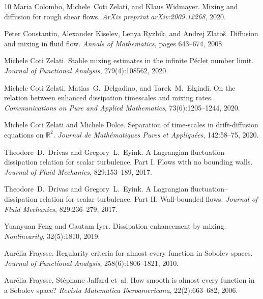 \documentclass[11pt,oneside,reqno]{amsart}
\newcommand{\tmtextit}[1]{{{\itshape{#1}}}}
\numberwithin{equation}{section}
\begin{document}
\begin{thebibliography}{10}
  Maria Colombo, Michele~Coti Zelati, and  Klaus
  Widmayer. {\newblock}Mixing and diffusion for rough shear flows.
  {\newblock}\tmtextit{ArXiv preprint arXiv:2009.12268}, 2020.{\newblock}
  
  Peter Constantin, Alexander Kiselev, Lenya
  Ryzhik, and  Andrej Zlato{\v s}. {\newblock}Diffusion and mixing in fluid
  flow. {\newblock}\tmtextit{Annals of Mathematics},  pages  643--674,
  2008.{\newblock}
  
  Michele Coti Zelati. {\newblock}Stable mixing
  estimates in the infinite P{\'e}clet number limit.
  {\newblock}\tmtextit{Journal of Functional Analysis}, 279(4):108562,
  2020.{\newblock}
  
  Michele Coti Zelati, Matias~G.~Delgadino,
  and  Tarek~M.~Elgindi. {\newblock}On the relation between enhanced
  dissipation timescales and mixing rates. {\newblock}\tmtextit{Communications
  on Pure and Applied Mathematics}, 73(6):1205--1244, 2020.{\newblock}
  
  Michele Coti Zelati  and  Michele Dolce.
  {\newblock}Separation of time-scales in drift-diffusion equations on
  $\mathbb{R}^2$. {\newblock}\tmtextit{Journal de Math{\'e}matiques Pures et
  Appliqu{\'e}es}, 142:58--75, 2020.{\newblock}
  
  Theodore~D.~Drivas  and  Gregory~L.~Eyink. {\newblock}A
  Lagrangian fluctuation--dissipation relation for scalar turbulence. Part I.
  Flows with no bounding walls. {\newblock}\tmtextit{Journal of Fluid
  Mechanics}, 829:153--189, 2017.{\newblock}
  
  Theodore~D.~Drivas  and  Gregory~L.~Eyink. {\newblock}A
  Lagrangian fluctuation--dissipation relation for scalar turbulence. Part II.
  Wall-bounded flows. {\newblock}\tmtextit{Journal of Fluid Mechanics},
  829:236--279, 2017.{\newblock}
  
  Yuanyuan Feng  and  Gautam Iyer.
  {\newblock}Dissipation enhancement by mixing.
  {\newblock}\tmtextit{Nonlinearity}, 32(5):1810, 2019.{\newblock}
  
  Aur{\'e}lia Fraysse. {\newblock}Regularity criteria
  for almost every function in Sobolev spaces. {\newblock}\tmtextit{Journal of
  Functional Analysis}, 258(6):1806--1821, 2010.{\newblock}
  
  Aur{\'e}lia Fraysse, St{\'e}phane Jaffard et~al.
  {\newblock}How smooth is almost every function in a Sobolev space?
  {\newblock}\tmtextit{Revista Matematica Iberoamericana}, 22(2):663--682,
  2006.{\newblock}
  

\end{thebibliography}
\end{document}
